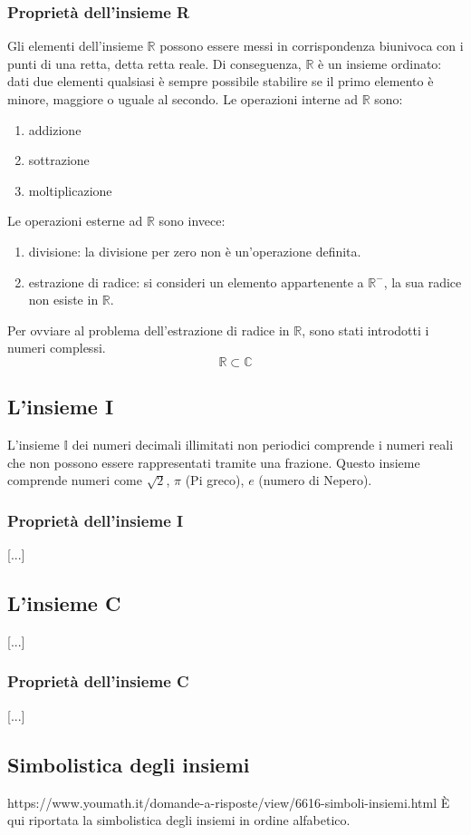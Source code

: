 \documentclass[a4paper,14pt]{extarticle}
\newcommand{\R}{\mathbb{R}}
\newcommand{\I}{\mathbb{I}}
\newcommand{\C}{\mathbb{C}}
\begin{document}
\subsubsection{Proprietà dell'insieme R}
Gli elementi dell'insieme $\R$ possono essere messi in corrispondenza biunivoca con i punti di una retta, detta retta reale. Di conseguenza, $\R$ è un insieme ordinato: dati due elementi qualsiasi è sempre possibile stabilire se il primo elemento è minore, maggiore o uguale al secondo.
\newline Le operazioni interne ad $\R$ sono:
\begin{enumerate}
    \item addizione
    \item sottrazione
    \item moltiplicazione
\end{enumerate}
Le operazioni esterne ad $\R$ sono invece:
\begin{enumerate}
    \item divisione: la divisione per zero non è un'operazione definita.
    \item estrazione di radice: si consideri un elemento appartenente a $\R^-$, la sua radice non esiste in $\R$.
\end{enumerate}
Per ovviare al problema dell'estrazione di radice in $\R$, sono stati introdotti i numeri complessi. \[ \R \subset \C \]
\newline
\subsection{L'insieme I}
L'insieme $\I$ dei numeri decimali illimitati non periodici comprende i numeri reali che non possono essere rappresentati tramite una frazione. Questo insieme comprende numeri come $\sqrt{2}$, $\pi$ (Pi greco), $e$ (numero di Nepero).
\subsubsection{Proprietà dell'insieme I}
[...]

\subsection{L'insieme C}
[...]
\subsubsection{Proprietà dell'insieme C}
[...]

\subsection{Simbolistica degli insiemi}
https://www.youmath.it/domande-a-risposte/view/6616-simboli-insiemi.html
\`{E} qui riportata la simbolistica degli insiemi in ordine alfabetico.
\end{document}
